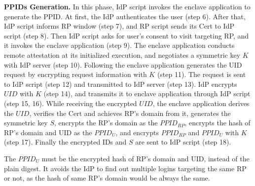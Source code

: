 \vspace{0.5mm}\noindent\textbf{PPIDs Generation.} In this phase, IdP script invokes the enclave application to generate the PPID.
At first, the IdP authenticates the user (step 6).
After that, IdP script informs RP window (step 7), and RP script sends its Cert to IdP script (step 8).
Then IdP script asks for user's consent to visit targeting RP, and it invokes the enclave application (step 9).
The enclave application conducts remote attestation at its initialized execution, and negotiates a symmetric key $K$ with IdP server (step 10).
Following the enclave application generates the UID request by encrypting request information with $K$ (step 11).
The request is sent to IdP script (step 12) and transmitted to IdP server (step 13).
IdP encrypts $UID$ with $K$ (step 14), and transmits it to enclave application through IdP script (step 15, 16).
While receiving the encrypted $UID$, the enclave application derives the $UID$, verifies the Cert and achieves RP's domain from it, generates the symmetric key $S$, encrypts the RP's domain as the  $PPID_{RP}$, encrypts the hash of RP's domain and UID as the $PPID_U$, and encrypts $PPID_{RP}$ and $PPID_U$ with $K$ (step 17).
Finally the encrypted IDs and $S$ are sent to IdP script (step 18).

The $PPID_U$ must be the encrypted hash of RP's domain and UID, instead of the plain digest. It avoids the IdP to find out multiple logins targeting the same RP or not, as the hash of same RP's domain would be always the same.


